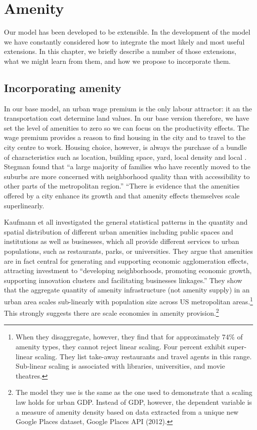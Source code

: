 \chapter{Amenity}\label{chapter-amenity}
Our model has been developed to be extensible. In the development of the model we have constantly considered how to integrate the most likely and most useful extensions. In this chapter, we briefly describe a number of those extensions, what we might learn from them, and how we propose to incorporate them.

\section[Amenity]{Incorporating amenity}\label{section-amenity}
In our base model,  an urban wage premium is the only labour attractor: it an the transportation cost determine land values. In our base version therefore, we have set the level of amenities to zero  so we can focus on the productivity effects. The wage premium provides a reason to find housing in the city and to travel to the city centre to work. Housing choice, however, is always the purchase of a bundle of characteristics such as location, building space, yard, local density and local . Stegman  found that ``a large majority of families who have recently moved to the suburbs are more concerned with neighborhood quality than with accessibility to other parts of the metropolitan region.'' 
``There is evidence that the amenities offered by a city enhance its growth \cite{clarkAmenitiesDriveUrban2002, falckPhantomOperaCultural2011a} and that amenity effects themselves scale superlinearly\cite{kraemerCulturalSustainabilityUS2022}. 



Kaufmann et all \cite{kaufmannScalingUrbanAmenities2022} investigated the general statistical patterns in the quantity and spatial distribution of different urban amenities including public spaces and institutions as well as businesses, which all provide different services to urban populations, such as restaurants, parks, or universities.  They argue that amenities are   in fact central for generating and supporting economic agglomeration effects, attracting investment to ``developing neighborhoods, promoting economic growth, supporting innovation clusters and facilitating businesses linkages.'' 
They show that the aggregate quantity of amenity infrastructure (not amenity supply)  in an urban area scales sub-linearly with population size across US metropolitan areas.\footnote{When they disaggregate, however, they find that for approximately 74\% of amenity types, they cannot reject linear scaling. Four percent exhibit super-linear scaling. They list take-away restaurants and travel agents in this range. Sub-linear scaling is associated with libraries, universities, and movie theatres.} This strongly suggests there are scale economies in amenity provision.\footnote{The model they use is the same as the one used to demonstrate that a scaling law holds for urban GDP. Instead of GDP, however, the dependent variable is a measure of amenity density based on data extracted from a unique new Google Places dataset, Google Places API (2012).} 


